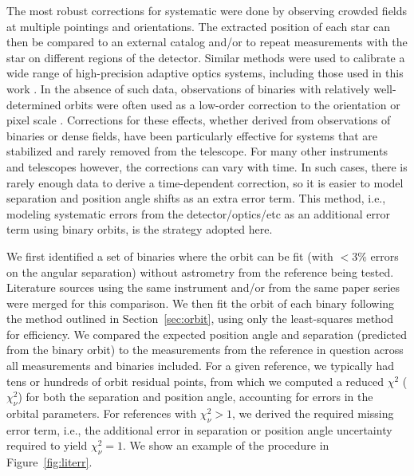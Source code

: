 \documentclass[twocolumn]{aastex62}
\begin{document}
The most robust corrections for systematic were done by observing crowded fields at multiple pointings and orientations. The extracted position of each star can then be compared to an external catalog and/or to repeat measurements with the star on different regions of the detector. Similar methods were used to calibrate a wide range of high-precision adaptive optics systems, including those used in this work \citep{Yelda2010, 2016PASP..128i5004S, 2015MNRAS.453.3234P}. In the absence of such data, observations of binaries with relatively well-determined orbits were often used as a low-order correction to the orientation or pixel scale \citep[e.g.,][]{Tok2015c}. Corrections for these effects, whether derived from observations of binaries or dense fields, have been particularly effective for systems that are stabilized and rarely removed from the telescope. For many other instruments and telescopes however, the corrections can vary with time. In such cases, there is rarely enough data to derive a time-dependent correction, so it is easier to model separation and position angle shifts as an extra error term. This method, i.e., modeling systematic errors from the detector/optics/etc as an additional error term using binary orbits, is the strategy  adopted here.

We first identified a set of binaries where the orbit can be fit (with $<3\%$ errors on the angular separation) without astrometry from the reference being tested. Literature sources using the same instrument and/or from the same paper series were merged for this comparison. We then fit the orbit of each binary following the method outlined in Section~\ref{sec:orbit}, using only the least-squares method for efficiency. We compared the expected position angle and separation (predicted from the binary orbit) to the measurements from the reference in question across all measurements and binaries included. For a given reference, we typically had tens or hundreds of orbit residual points, from which we computed a reduced $\chi^2$ ($\chi^2_\nu$) for both the separation and position angle, accounting for errors in the orbital parameters. For references with $\chi^2_\nu > 1$, we derived the required missing error term, i.e., the additional error in separation or position angle uncertainty required to yield $\chi^2_\nu = 1$. We show an example of the procedure in Figure~\ref{fig:literr}. 
\end{document}
